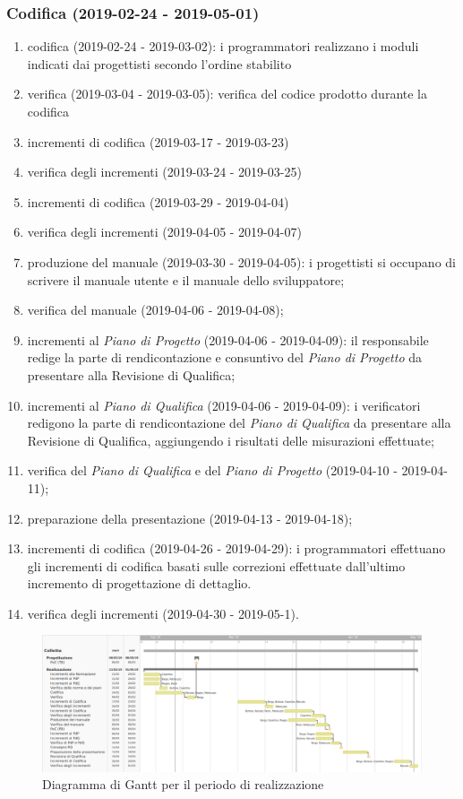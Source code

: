 		\subsubsection{Codifica (2019-02-24 - 2019-05-01)}
			\begin{enumerate}[label= 4.2.\arabic*)]
				\item codifica (2019-02-24 - 2019-03-02): i programmatori realizzano i moduli indicati dai progettisti secondo l'ordine stabilito
				\item verifica (2019-03-04 - 2019-03-05): verifica del codice prodotto durante la codifica
				\item incrementi di codifica (2019-03-17 - 2019-03-23)
				\item verifica degli incrementi (2019-03-24 - 2019-03-25)
				\item incrementi di codifica (2019-03-29 - 2019-04-04)
				\item verifica degli incrementi (2019-04-05 - 2019-04-07)
				\item produzione del manuale (2019-03-30 - 2019-04-05): i progettisti si occupano di scrivere il manuale utente e il manuale dello sviluppatore;
				\item verifica del manuale (2019-04-06 - 2019-04-08);
				\item incrementi al \textit{Piano di Progetto} (2019-04-06 - 2019-04-09): il responsabile redige la parte di rendicontazione e consuntivo del \textit{Piano di Progetto} da presentare alla Revisione di Qualifica;
				\item incrementi al \textit{Piano di Qualifica} (2019-04-06 - 2019-04-09): i verificatori redigono la parte di rendicontazione del \textit{Piano di Qualifica} da presentare alla Revisione di Qualifica, aggiungendo i risultati delle misurazioni effettuate;
				\item verifica del \textit{Piano di Qualifica} e del \textit{Piano di Progetto} (2019-04-10 - 2019-04-11);
				\item preparazione della presentazione (2019-04-13 - 2019-04-18);
				\item incrementi di codifica (2019-04-26 - 2019-04-29): i programmatori effettuano gli incrementi di codifica basati sulle correzioni effettuate dall'ultimo incremento di progettazione di dettaglio.
				\item verifica degli incrementi (2019-04-30 - 2019-05-1).
			\end{enumerate}
		
	\newpage
	\begin{figure}[!hbtp]
		\centering
		\includegraphics[scale=0.5, angle=90]{images/ganttreal.png}
		\caption{Diagramma di Gantt per il periodo di realizzazione}
	\end{figure}
	
